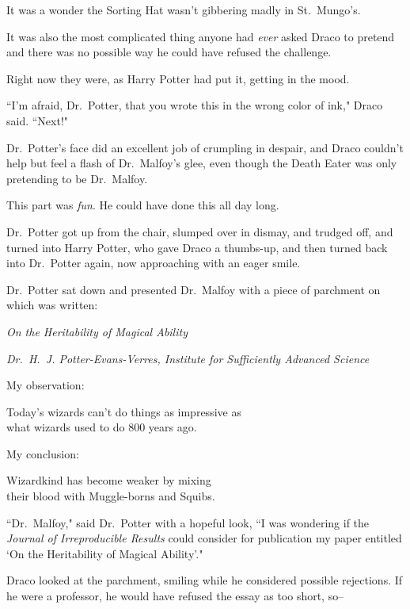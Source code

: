 It was a wonder the Sorting Hat wasn't gibbering madly in St.~Mungo's.

It was also the most complicated thing anyone had \emph{ever} asked Draco to pretend and there was no possible way he could have refused the challenge.

Right now they were, as Harry Potter had put it, getting in the mood.

``I'm afraid, Dr.~Potter, that you wrote this in the wrong color of ink," Draco said. ``Next!"

Dr.~Potter's face did an excellent job of crumpling in despair, and Draco couldn't help but feel a flash of Dr.~Malfoy's glee, even though the Death Eater was only pretending to be Dr.~Malfoy.

This part was \emph{fun}. He could have done this all day long.

Dr.~Potter got up from the chair, slumped over in dismay, and trudged off, and turned into Harry Potter, who gave Draco a thumbs-up, and then turned back into Dr.~Potter again, now approaching with an eager smile.

Dr.~Potter sat down and presented Dr.~Malfoy with a piece of parchment on which was written:

\begin{center}
\emph{On the Heritability of Magical Ability}

\emph{Dr.~H.~J. Potter-Evans-Verres, Institute for Sufficiently Advanced Science}
\end{center}

\begin{writtenNote}
My observation:

Today's wizards can't do things as impressive as\\
what wizards used to do 800 years ago.

My conclusion:

Wizardkind has become weaker by mixing\\
their blood with Muggle-borns and Squibs.
\end{writtenNote}

``Dr.~Malfoy," said Dr.~Potter with a hopeful look, ``I was wondering if the \emph{Journal of Irreproducible Results} could consider for publication my paper entitled `On the Heritability of Magical Ability'."

Draco looked at the parchment, smiling while he considered possible rejections. If he were a professor, he would have refused the essay as too short, so\---

